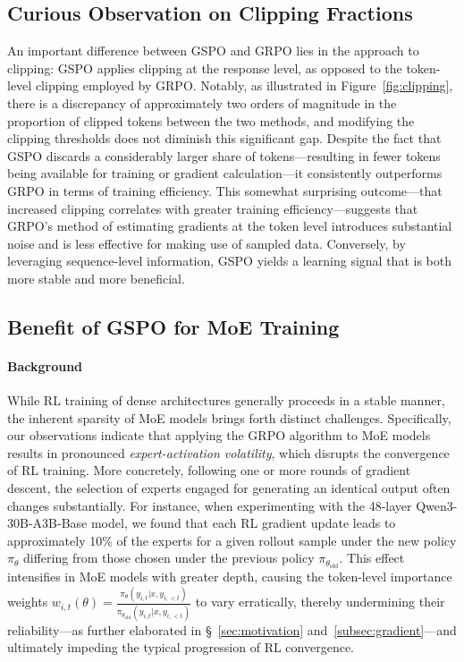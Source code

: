 \subsection{Curious Observation on Clipping Fractions}

An important difference between GSPO and GRPO lies in the approach to clipping: GSPO applies clipping at the response level, as opposed to the token-level clipping employed by GRPO. Notably, as illustrated in Figure~\ref{fig:clipping}, there is a discrepancy of approximately two orders of magnitude in the proportion of clipped tokens between the two methods, and modifying the clipping thresholds does not diminish this significant gap. Despite the fact that GSPO discards a considerably larger share of tokens—resulting in fewer tokens being available for training or gradient calculation—it consistently outperforms GRPO in terms of training efficiency. This somewhat surprising outcome—that increased clipping correlates with greater training efficiency—suggests that GRPO's method of estimating gradients at the token level introduces substantial noise and is less effective for making use of sampled data. Conversely, by leveraging sequence-level information, GSPO yields a learning signal that is both more stable and more beneficial.

\subsection{Benefit of GSPO for MoE Training}
\label{subsec:routing_replay}

\paragraph{Background}
While RL training of dense architectures generally proceeds in a stable manner, the inherent sparsity of MoE models brings forth distinct challenges. Specifically, our observations indicate that applying the GRPO algorithm to MoE models results in pronounced \textit{expert-activation volatility}, which disrupts the convergence of RL training. More concretely, following one or more rounds of gradient descent, the selection of experts engaged for generating an identical output often changes substantially. For instance, when experimenting with the 48-layer Qwen3-30B-A3B-Base model, we found that each RL gradient update leads to approximately 10\% of the experts for a given rollout sample under the new policy $\pi_{\theta}$ differing from those chosen under the previous policy $\pi_{\theta_\text{old}}$. This effect intensifies in MoE models with greater depth, causing the token-level importance weights $w_{i,t}(\theta) = \frac{ \pi_{\theta} (y_{i,t} | x, y_{i,<t}) }{ \pi_{\theta_\text{old}} (y_{i,t} | x,y_{i,<t})}$ to vary erratically, thereby undermining their reliability—as further elaborated in \S~\ref{sec:motivation} and~\ref{subsec:gradient}—and ultimately impeding the typical progression of RL convergence.

